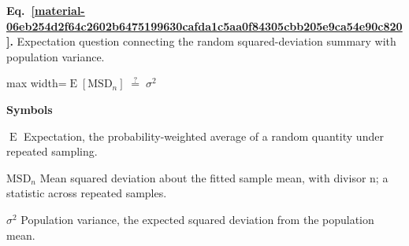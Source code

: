 \documentclass[11pt,a4paper]{article}
\begin{document}
\par\medskip
\noindent\begin{minipage}{\linewidth}
\label{material-06eb254d2f64c2602b6475199630cafda1c5aa0f84305cbb205e9ca54e90c820}
\noindent\textbf{Eq.~\ref*{material-06eb254d2f64c2602b6475199630cafda1c5aa0f84305cbb205e9ca54e90c820}.} Expectation question connecting the random squared-deviation summary with population variance.\par\nopagebreak
\begin{center}\begin{adjustbox}{max width=\linewidth}$\displaystyle \operatorname{E}[\mathrm{MSD}_n]\;\overset{?}{=}\;\sigma^2$\end{adjustbox}\end{center}

\par\noindent\textbf{Symbols}

\par\noindent\textbf{\(\operatorname{E}\)} Expectation, the probability-weighted average of a random quantity under repeated sampling.

\par\noindent\textbf{\(\mathrm{MSD}_n\)} Mean squared deviation about the fitted sample mean, with divisor n; a statistic across repeated samples.

\par\noindent\textbf{\(\sigma^2\)} Population variance, the expected squared deviation from the population mean.

\end{minipage}\par
\medskip
\end{document}
